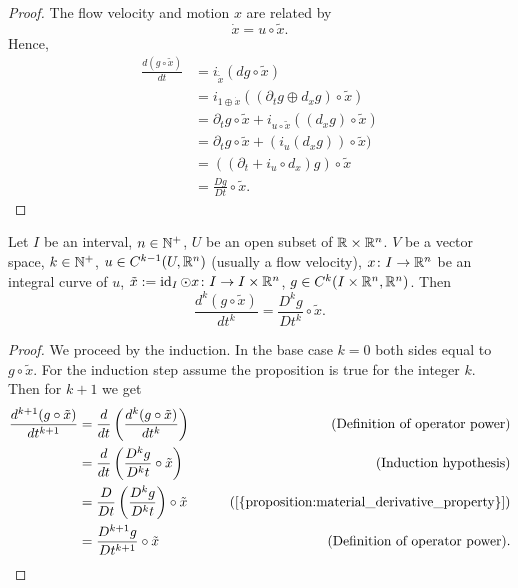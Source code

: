 \begin{proof}
  The flow velocity and motion $x$ are related by
  \begin{equation}
    \dot{x} = u \circ \tilde{x}.
  \end{equation}
  Hence,
  \begin{equation}
    \begin{split}
      \frac{d (g \circ \tilde{x})}{d t}
      & = i_{\dot{\tilde{x}}}(d g \circ \tilde{x}) \\
      & = i_{1 \oplus \dot{x}}((\partial_t g \oplus d_x g) \circ \tilde{x}) \\
      & = \partial_t g \circ \tilde{x}
        + i_{u \circ \tilde{x}} ((d_x g) \circ \tilde{x}) \\
      & = \partial_t g \circ \tilde{x} + (i_u(d_x g)) \circ \tilde{x}) \\
      & = ((\partial_t + i_u \circ d_x) g) \circ \tilde{x} \\
      & = \frac{D g}{D t} \circ \tilde{x}.
    \end{split}
  \end{equation}
\end{proof}
\begin{corollary}
  Let
    $I$ be an interval,
    $n \in \mathbb{N}^+$,
    $U$ be an open subset of $\mathbb{R} \times \mathbb{R}^n$.
    $V$ be a vector space,
    $k \in \mathbb{N}^+$,
    $u \in C^{k - 1}(U, \mathbb{R}^n)$ (usually a flow velocity),
    $x \colon I \to \mathbb{R}^n$ be an integral curve of $u$,
    $\tilde{x} := \mathop{\rm id}\nolimits_I \odot x \colon I \to I \times \mathbb{R}^n$,
    $g \in C^k(I \times \mathbb{R}^n, \mathbb{R}^n)$.
  Then
  \begin{equation}
    \frac{d^k (g \circ \tilde{x})}{d t^k} = \frac{D^k g}{D t^k} \circ \tilde{x}.
  \end{equation}
\end{corollary}
\begin{proof}
  We proceed by the induction.
  In the base case $k = 0$ both sides equal to $g \circ \tilde{x}$.
  For the induction step assume the proposition is true for the integer $k$.
  Then for $k + 1$ we get
  \begin{equation}
    \begin{split}
      \frac{d^{k + 1} (g \circ \tilde{x})}{d t^{k + 1}}
      & = \frac{d}{d t}\left(\frac{d^k (g \circ \tilde{x})}{d t^k}\right)
      & \qquad (\text{Definition of operator power}) \\
      & = \frac{d}{d t}\left(\frac{D^k g}{D^k t} \circ \tilde{x}\right)
      & \qquad (\text{Induction hypothesis}) \\
      & = \frac{D}{D t}\left(\frac{D^k g}{D^k t}\right) \circ \tilde{x}
      & \qquad (\text{\Cref{{proposition:material_derivative_property}}}) \\
      & = \frac{D^{k + 1} g}{D t^{k + 1}} \circ \tilde{x}
      & \qquad (\text{Definition of operator power}).
    \end{split}
  \end{equation}
\end{proof}
